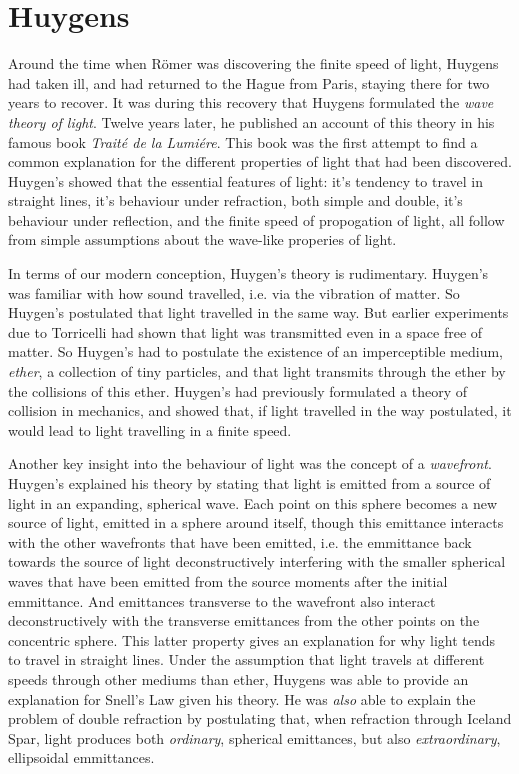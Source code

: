 \section{Huygens}

Around the time when R\"{o}mer was discovering the finite speed of light, Huygens had taken ill, and had returned to the Hague from Paris, staying there for two years to recover. It was during this recovery that Huygens formulated the \emph{wave theory of light}. Twelve years later, he published an account of this theory in his famous book \emph{Trait\'{e} de la Lumi\'{e}re}. This book was the first attempt to find a common explanation for the different properties of light that had been discovered. Huygen's showed that the essential features of light: it's tendency to travel in straight lines, it's behaviour under refraction, both simple and double, it's behaviour under reflection, and the finite speed of propogation of light, all follow from simple assumptions about the wave-like properies of light.

In terms of our modern conception, Huygen's theory is rudimentary. Huygen's was familiar with how sound travelled, i.e. via the vibration of matter. So Huygen's postulated that light travelled in the same way. But earlier experiments due to Torricelli had shown that light was transmitted even in a space free of matter. So Huygen's had to postulate the existence of an imperceptible medium, \emph{ether}, a collection of tiny particles, and that light transmits through the ether by the collisions of this ether. Huygen's had previously formulated a theory of collision in mechanics, and showed that, if light travelled in the way postulated, it would lead to light travelling in a finite speed.

Another key insight into the behaviour of light was the concept of a \emph{wavefront}. Huygen's explained his theory by stating that light is emitted from a source of light in an expanding, spherical wave. Each point on this sphere becomes a new source of light, emitted in a sphere around itself, though this emittance interacts with the other wavefronts that have been emitted, i.e. the emmittance back towards the source of light deconstructively interfering with the smaller spherical waves that have been emitted from the source moments after the initial emmittance. And emittances transverse to the wavefront also interact deconstructively with the transverse emittances from the other points on the concentric sphere. This latter property gives an explanation for why light tends to travel in straight lines. Under the assumption that light travels at different speeds through other mediums than ether, Huygens was able to provide an explanation for Snell's Law given his theory. He was \emph{also} able to explain the problem of double refraction by postulating that, when refraction through Iceland Spar, light produces both \emph{ordinary}, spherical emittances, but also \emph{extraordinary}, ellipsoidal emmittances.

